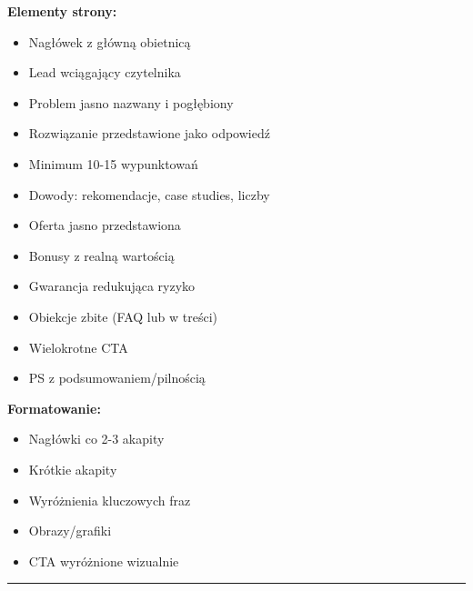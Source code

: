 \documentclass[
  12pt,
  a4paper,
  twoside,
  openright,
  12pt,
  DIV=12,
  BCOR=12mm]{scrbook}
\providecommand{\tightlist}{%
  \setlength{\itemsep}{0pt}\setlength{\parskip}{0pt}}\usepackage{longtable,booktabs,array}
\newcommand{\decoline}{%
  \begin{center}
    \textcolor{bordergray}{\rule{0.3\textwidth}{0.5pt}}
  \end{center}
}
\begin{document}
\textbf{Elementy strony:}

\begin{itemize}
\tightlist
\item[$\square$]
  Nagłówek z główną obietnicą
\item[$\square$]
  Lead wciągający czytelnika
\item[$\square$]
  Problem jasno nazwany i pogłębiony
\item[$\square$]
  Rozwiązanie przedstawione jako odpowiedź
\item[$\square$]
  Minimum 10-15 wypunktowań
\item[$\square$]
  Dowody: rekomendacje, case studies, liczby
\item[$\square$]
  Oferta jasno przedstawiona
\item[$\square$]
  Bonusy z realną wartością
\item[$\square$]
  Gwarancja redukująca ryzyko
\item[$\square$]
  Obiekcje zbite (FAQ lub w treści)
\item[$\square$]
  Wielokrotne CTA
\item[$\square$]
  PS z podsumowaniem/pilnością
\end{itemize}

\textbf{Formatowanie:}

\begin{itemize}
\tightlist
\item[$\square$]
  Nagłówki co 2-3 akapity
\item[$\square$]
  Krótkie akapity
\item[$\square$]
  Wyróżnienia kluczowych fraz
\item[$\square$]
  Obrazy/grafiki
\item[$\square$]
  CTA wyróżnione wizualnie
\end{itemize}

\decoline
\end{document}
